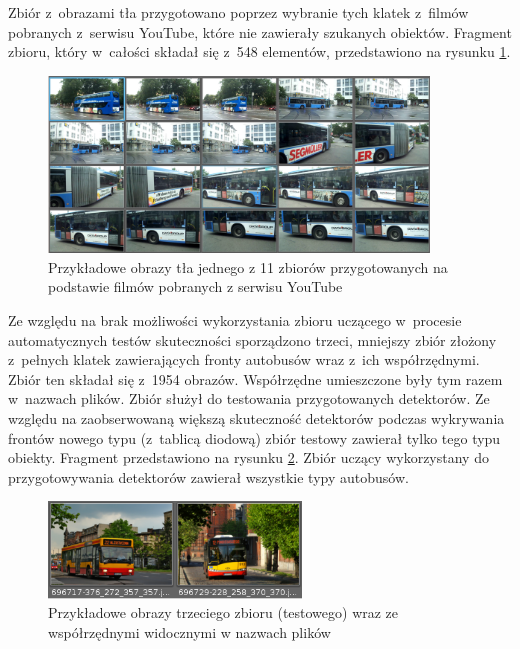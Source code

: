 Zbiór z~obrazami tła
przygotowano poprzez wybranie tych klatek z~filmów pobranych z~serwisu
YouTube, które nie
zawierały szukanych obiektów. Fragment zbioru, który w~całości
składał się z~548 elementów, przedstawiono na rysunku \ref{fig:exp_first_background_sample}.

\begin{figure}[!h]
	\centering
	\includegraphics[width=0.9\textwidth]{img/exp_first_background_sample}
	\caption{Przykładowe obrazy tła jednego z 11 zbiorów
		przygotowanych na podstawie
		filmów pobranych z serwisu YouTube}
	\label{fig:exp_first_background_sample}
\end{figure}

Ze względu na brak możliwości wykorzystania zbioru uczącego
w~procesie automatycznych testów skuteczności sporządzono trzeci,
mniejszy zbiór złożony z~pełnych klatek zawierających
fronty autobusów wraz z~ich współrzędnymi. Zbiór ten składał się
z~1954 obrazów. Współrzędne umieszczone były tym razem w~nazwach
plików. Zbiór służył do testowania przygotowanych detektorów. 
Ze względu na zaobserwowaną większą skuteczność detektorów podczas
wykrywania frontów nowego typu (z~tablicą diodową) zbiór testowy
zawierał tylko tego typu obiekty. Fragment przedstawiono na rysunku
\ref{fig:exp_third_whole_sample}. Zbiór uczący wykorzystany do
przygotowywania detektorów zawierał wszystkie typy autobusów.

\begin{figure}[!h]
	\centering
	\includegraphics[width=0.6\textwidth]{img/exp_third_whole_sample}
	\caption{Przykładowe obrazy trzeciego zbioru (testowego) 
		wraz ze współrzędnymi widocznymi w nazwach plików}
	\label{fig:exp_third_whole_sample}
\end{figure}

